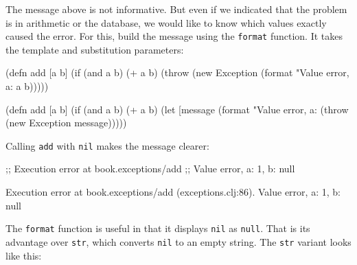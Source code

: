 \fi

The message above is not informative. But even if we indicated that the problem is in arithmetic or the database, we would like to know which values exactly caused the error. For this, build the message using the \verb|format| function. It takes the template and substitution parameters: 


\ifx\DEVICETYPE\MOBILE

\begin{english}
  \begin{clojure}
(defn add [a b]
  (if (and a b)
    (+ a b)
    (throw
      (new Exception
        (format
          "Value error, a: %
          a b)))))
  \end{clojure}
\end{english}

\else

\begin{english}
  \begin{clojure}
(defn add [a b]
  (if (and a b)
    (+ a b)
    (let [message (format "Value error, a: %
      (throw (new Exception message)))))
  \end{clojure}
\end{english}

\fi

\noindent
Calling \verb|add| with \verb|nil| makes the message clearer:

\ifx\DEVICETYPE\MOBILE

\begin{english}
  \begin{clojure}
;; Execution error at book.exceptions/add
;; Value error, a: 1, b: null
  \end{clojure}
\end{english}

\else

\begin{english}
  \begin{clojure}
Execution error at book.exceptions/add (exceptions.clj:86).
Value error, a: 1, b: null
  \end{clojure}
\end{english}

\fi

The \verb|format| function is useful in that it displays \verb|nil| as \verb|null|. That is its advantage over \verb|str|, which converts \verb|nil| to an empty string. The \verb|str| variant looks like this:

